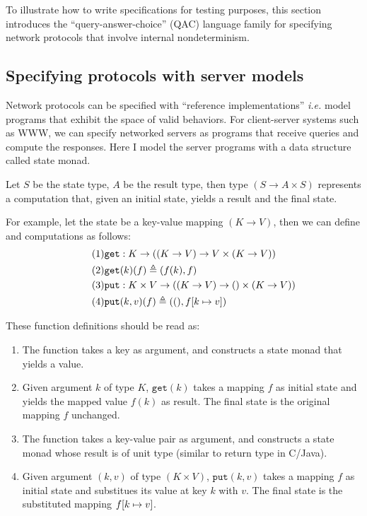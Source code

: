 To illustrate how to write specifications for testing purposes, this section
introduces the ``query-answer-choice'' (QAC) language family for specifying
network protocols that involve internal nondeterminism.

\subsection{Specifying protocols with server models}
Network protocols can be specified with ``reference implementations'' {\it i.e.}
model programs that exhibit the space of valid behaviors.  For client-server
systems such as WWW, we can specify networked servers as programs that receive
queries and compute the responses.  Here I model the server programs with a data
structure called state monad.

\begin{definition}
  Let $S$ be the state type, $A$ be the result type, then type $(S\to A\times
  S)$ represents a computation that, given an initial state, yields a result and
  the final state.

  For example, let the state be a key-value mapping $(K\to V)$, then we can
  define  and  computations as follows:
  \begin{align}
    \tag{1}&\mathtt{get}:K\to((K\to V)\to V\times(K\to V))\\
    \tag{2}&\mathtt{get}(k)(f)\triangleq (f(k), f)\\
    \tag{3}&\mathtt{put}:K\times V\to((K\to V)\to ()\times(K\to V))\\
    \tag{4}&\mathtt{put}(k,v)(f)\triangleq((),f[k\mapsto v])
  \end{align}

  These function definitions should be read as:
  \begin{enumerate}
    \item The  function takes a key as argument, and constructs a
      state monad that yields a value.
    \item Given argument $k$ of type $K$, $\mathtt{get}(k)$ takes a mapping $f$
      as initial state and yields the mapped value $f(k)$ as result.  The final
      state is the original mapping $f$ unchanged.
    \item The  function takes a key-value pair as argument, and
      constructs a state monad whose result is of unit type (similar to
       return type in C/Java).
    \item Given argument $(k,v)$ of type $(K\times V)$, $\mathtt{put}(k,v)$
      takes a mapping $f$ as initial state and substitues its value at key $k$
      with $v$.  The final state is the substituted mapping $f[k\mapsto v]$.
  \end{enumerate}
\end{definition}

